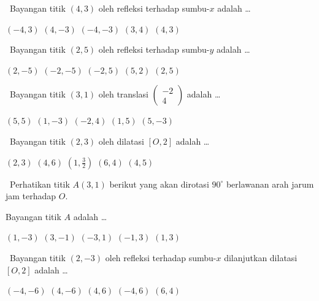 \documentclass[11pt,a4paper]{exam}
\newcommand{\Fund}{{\footnotesize\textsf{\textcolor{hijau}{[Fundamental]}}}\ }
\newcommand{\Inter}{{\footnotesize\textsf{\textcolor{biru}{[Intermediate]}}}\ }
\newcommand{\Adv}{{\footnotesize\textsf{\textcolor{oranye}{[Advanced]}}}\ }
\begin{document}
\begin{questions}

\question \Fund Bayangan titik $(4,3)$ oleh refleksi terhadap sumbu-$x$ adalah \dots
\begin{choices}
\choice $(-4,3)$ \CorrectChoice $(4,-3)$ \choice $(-4,-3)$ \choice $(3,4)$ \choice $(4,3)$
\end{choices}

\question \Fund Bayangan titik $(2,5)$ oleh refleksi terhadap sumbu-$y$ adalah \dots
\begin{choices}
\choice $(2,-5)$ \choice $(-2,-5)$ \CorrectChoice $(-2,5)$ \choice $(5,2)$ \choice $(2,5)$
\end{choices}

\question \Inter Bayangan titik $(3,1)$ oleh translasi $\begin{pmatrix} -2\\ 4 \end{pmatrix}$ adalah \dots
\begin{choices}
\choice $(5,5)$ \choice $(1,-3)$ \choice $(-2,4)$ \CorrectChoice $(1,5)$ \choice $(5,-3)$
\end{choices}

\question \Inter Bayangan titik $(2,3)$ oleh dilatasi $[O,2]$ adalah \dots
\begin{choices}
\choice $(2,3)$ \CorrectChoice $(4,6)$ \choice $(1,\tfrac{3}{2})$ \choice $(6,4)$ \choice $(4,5)$
\end{choices}

\question \Inter Perhatikan titik $A(3,1)$ berikut yang akan dirotasi $90^\circ$
berlawanan arah jarum jam terhadap $O$.

\begin{center}
\end{center}

Bayangan titik $A$ adalah \dots
\begin{choices}
\choice $(1,-3)$ \choice $(3,-1)$ \choice $(-3,1)$ \CorrectChoice $(-1,3)$ \choice $(1,3)$
\end{choices}

\question \Adv Bayangan titik $(2,-3)$ oleh refleksi terhadap sumbu-$x$ dilanjutkan
dilatasi $[O,2]$ adalah \dots
\begin{choices}
\choice $(-4,-6)$ \choice $(4,-6)$ \CorrectChoice $(4,6)$ \choice $(-4,6)$ \choice $(6,4)$
\end{choices}


\end{questions}
\end{document}
